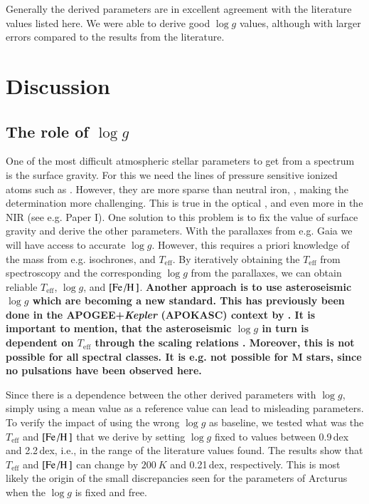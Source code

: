 \documentclass{aa}
\begin{document}
Generally the derived parameters are in excellent agreement with the literature
values listed here. We were able to derive good $\log g$ values, although with
larger errors compared to the results from the literature. {}



\section{Discussion}
\label{sec:discussion}

\subsection{The role of $\log g$}

One of the most difficult atmospheric stellar parameters to get from a spectrum
is the surface gravity. For this we need the lines of pressure sensitive ionized
atoms such as . However, they are more sparse than neutral iron,
, making the determination more challenging. This is true in the
optical \citep[see e.g. the discussion by][]{Mortier2013c}, and even more in the
NIR (see e.g. Paper I). One solution to this problem is to fix the value of
surface gravity and derive the other parameters. With the parallaxes from e.g.
Gaia \citep{GAIA} we will have access to accurate $\log g$. However, this
requires a priori knowledge of the mass from e.g. isochrones, and
$T_\mathrm{eff}$. By iteratively obtaining the $T_\mathrm{eff}$ from
spectroscopy and the corresponding $\log g$ from the parallaxes, we can obtain
reliable $T_\mathrm{eff}$, $\log g$, and $[\ion{Fe}/\ion{H}]$. {\bf Another
approach is to use asteroseismic $\log g$ which are becoming a new standard.
This has previously been done in the APOGEE+\emph{Kepler} (APOKASC) context by
\citet{Pinsonneault2014,Hawkins2016}. It is important to mention, that the
asteroseismic $\log g$ in turn is dependent on $T_\mathrm{eff}$ through the
scaling relations \citep[see e.g.][]{Kjeldsen1995}. Moreover, this is not
possible for all spectral classes. It is e.g. not possible for M stars, since no
pulsations have been observed here.}

Since there is a dependence between the other derived parameters with $\log g$,
simply using a mean value as a reference value can lead to misleading
parameters. To verify the impact of using the wrong $\log g$ as baseline, we
tested what was the $T_\mathrm{eff}$ and $[\ion{Fe}/\ion{H}]$ that we derive by
setting $\log g$ fixed to values between 0.9\,dex and 2.2\,dex, i.e., in the
range of the literature values found. The results show that $T_\mathrm{eff}$ and
$[\ion{Fe}/\ion{H}]$ can change by $\SI{200}{K}$ and 0.21\,dex, respectively.
This is most likely the origin of the small discrepancies seen for the
parameters of Arcturus when the $\log g$ is fixed and free.
\end{document}
